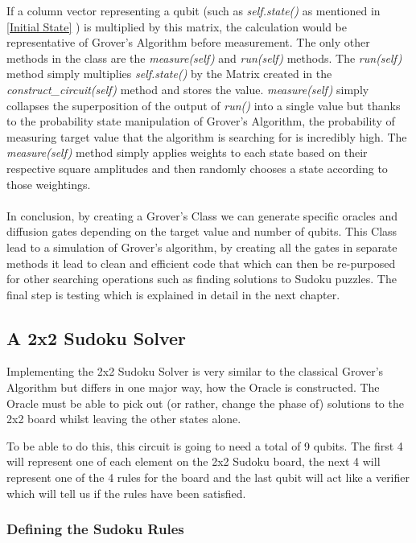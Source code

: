 \documentclass{article}
\begin{document}
 If a column vector representing a qubit (such as \textit{self.state()} as mentioned in \ref{Initial State} ) is multiplied by this matrix, the calculation would be representative of Grover's Algorithm before measurement. The only other methods in the class are the \textit{measure(self)} and \textit{run(self)} methods. The \textit{run(self)} method simply multiplies \textit{self.state()} by the Matrix created in the \textit{construct\_circuit(self)} method and stores the value. \textit{measure(self)} simply collapses the superposition of the output of \textit{run()} into a single value but thanks to the probability state manipulation of Grover's Algorithm, the probability of measuring target value that the algorithm is searching for is incredibly high. The \textit{measure(self)} method simply applies weights to each state based on their respective square amplitudes and then randomly chooses a state according to those weightings. 
 \\
 \\
 In conclusion, by creating a Grover's Class we can generate specific oracles and diffusion gates depending on the target value and number of qubits. This Class lead to a simulation of Grover's algorithm, by creating all the gates in separate methods it lead to clean and efficient code that which can then be re-purposed for other searching operations such as finding solutions to Sudoku puzzles. The final step is testing which is explained in detail in the next chapter.

\subsection{A 2x2 Sudoku Solver}

Implementing the 2x2 Sudoku Solver is very similar to the classical Grover's Algorithm but differs in one major way, how the Oracle is constructed. The Oracle must be able to pick out (or rather, change the phase of) solutions to the 2x2 board whilst leaving the other states alone.

To be able to do this, this circuit is going to need a total of 9 qubits. The first 4 will represent one of each element on the 2x2 Sudoku board, the next 4 will represent one of the 4 rules for the board and the last qubit will act like a verifier which will tell us if the rules have been satisfied.

\subsubsection{Defining the Sudoku Rules} \label{sudoku rules}
\end{document}
